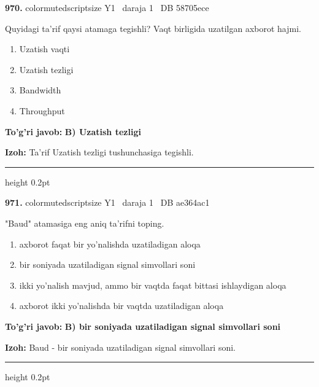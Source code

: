 \documentclass[10pt,a4paper,oneside]{article}
\begin{document}
\noindent\textbf{\color{ink}970.}  {color{muted}scriptsize Y1 \textbullet\ daraja 1 \textbullet\ DB 58705ece}
\par
Quyidagi ta'rif qaysi atamaga tegishli? Vaqt birligida uzatilgan axborot hajmi.
\begin{enumerate}[label=\Alph*),leftmargin=9mm]
\item Uzatish vaqti
\item Uzatish tezligi
\item Bandwidth
\item Throughput
\end{enumerate}
\begin{tcolorbox}[enhanced,breakable,colback=teal!4,colframe=teal!50!black,boxrule=0.5pt,arc=1.1mm,left=3mm,right=3mm,top=1.7mm,bottom=1.7mm,before skip=2mm,after skip=2mm]
\textbf{\color{teal}To'g'ri javob:} \textbf{B) Uzatish tezligi}
\par\smallskip
\textbf{Izoh:} Ta'rif Uzatish tezligi tushunchasiga tegishli.
\end{tcolorbox}
\vspace{2mm}\hrule height 0.2pt \vspace{3mm}

\noindent\textbf{\color{ink}971.}  {color{muted}scriptsize Y1 \textbullet\ daraja 1 \textbullet\ DB ae364ac1}
\par
"Baud" atamasiga eng aniq ta'rifni toping.
\begin{enumerate}[label=\Alph*),leftmargin=9mm]
\item axborot faqat bir yo'nalishda uzatiladigan aloqa
\item bir soniyada uzatiladigan signal simvollari soni
\item ikki yo'nalish mavjud, ammo bir vaqtda faqat bittasi ishlaydigan aloqa
\item axborot ikki yo'nalishda bir vaqtda uzatiladigan aloqa
\end{enumerate}
\begin{tcolorbox}[enhanced,breakable,colback=teal!4,colframe=teal!50!black,boxrule=0.5pt,arc=1.1mm,left=3mm,right=3mm,top=1.7mm,bottom=1.7mm,before skip=2mm,after skip=2mm]
\textbf{\color{teal}To'g'ri javob:} \textbf{B) bir soniyada uzatiladigan signal simvollari soni}
\par\smallskip
\textbf{Izoh:} Baud - bir soniyada uzatiladigan signal simvollari soni.
\end{tcolorbox}
\vspace{2mm}\hrule height 0.2pt \vspace{3mm}
\end{document}
